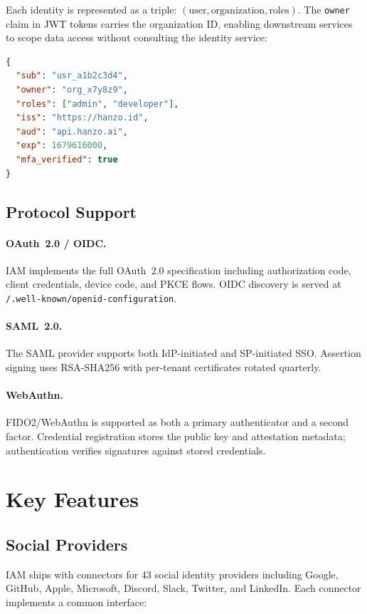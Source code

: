 \documentclass[11pt,twocolumn]{article}
\begin{document}
Each identity is represented as a triple: $(\text{user}, \text{organization}, \text{roles})$. The \texttt{owner} claim in JWT tokens carries the organization ID, enabling downstream services to scope data access without consulting the identity service:

\begin{lstlisting}[language=JSON]
{
  "sub": "usr_a1b2c3d4",
  "owner": "org_x7y8z9",
  "roles": ["admin", "developer"],
  "iss": "https://hanzo.id",
  "aud": "api.hanzo.ai",
  "exp": 1679616000,
  "mfa_verified": true
}
\end{lstlisting}

\subsection{Protocol Support}

\paragraph{OAuth~2.0 / OIDC.} IAM implements the full OAuth~2.0 specification including authorization code, client credentials, device code, and PKCE flows. OIDC discovery is served at \texttt{/.well-known/openid-configuration}.

\paragraph{SAML~2.0.} The SAML provider supports both IdP-initiated and SP-initiated SSO. Assertion signing uses RSA-SHA256 with per-tenant certificates rotated quarterly.

\paragraph{WebAuthn.} FIDO2/WebAuthn is supported as both a primary authenticator and a second factor. Credential registration stores the public key and attestation metadata; authentication verifies signatures against stored credentials.

\section{Key Features}

\subsection{Social Providers}

IAM ships with connectors for 43 social identity providers including Google, GitHub, Apple, Microsoft, Discord, Slack, Twitter, and LinkedIn. Each connector implements a common interface:
\end{document}
